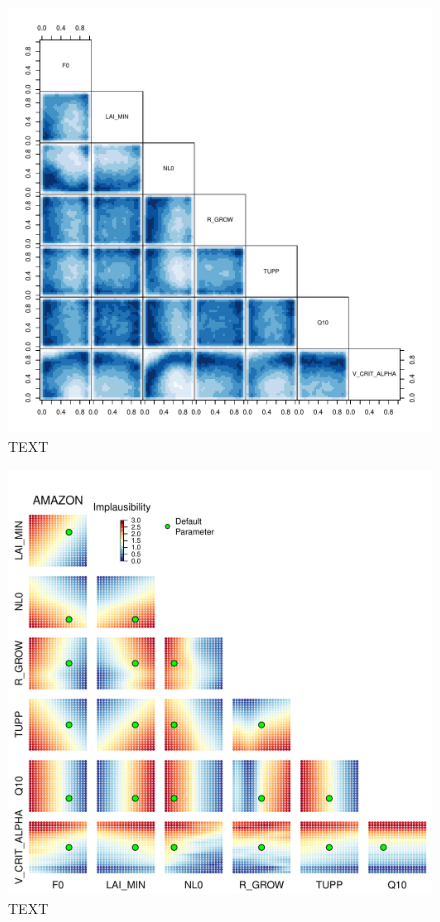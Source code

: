 \documentclass[esd, manuscript]{copernicus}
\begin{document}
\begin{figure}[t]
\includegraphics[width=12cm]{graphics/best_inputs_congo.pdf}
\caption{TEXT}
\label{fig:}
\end{figure}

\begin{figure}[t]
\includegraphics[width=12cm]{graphics/taat_amaz.pdf}
\caption{TEXT}
\label{fig:taat_amaz}
\end{figure}
\end{document}

